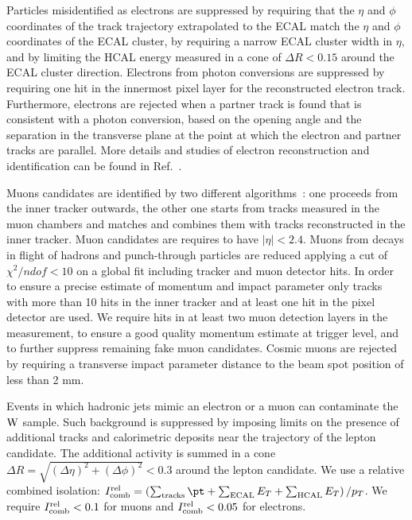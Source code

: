 \par
Particles misidentified as electrons are 
suppressed by requiring that the $\eta$ and $\phi$ coordinates
of the track trajectory extrapolated to the ECAL match the $\eta$ and
$\phi$ coordinates of the ECAL cluster, by requiring a narrow ECAL
cluster width in $\eta$, and by limiting the HCAL energy measured in a
cone of $\Delta R < 0.15$ around the ECAL cluster direction.
Electrons from photon conversions are suppressed by requiring
one hit in the innermost pixel layer for the
reconstructed electron track.  Furthermore, electrons are
rejected when a partner track is found that is consistent with a
photon conversion, based on the opening angle and the separation in
the transverse plane at the point at which the electron and partner
tracks are parallel. More details and studies of electron reconstruction
and identification can be found in Ref.~\cite{CMS-PAS-EGM-10-004}.


\par
Muons candidates are identified by two different 
algorithms~\cite{MUONPAS}: one proceeds from the inner tracker outwards, 
the other one starts from tracks measured in the muon chambers and matches 
and combines them with tracks reconstructed in the inner tracker. 
Muon candidates are requires to have $|\eta| < 2.4$.
Muons from decays in flight of hadrons and punch-through particles are 
reduced applying a cut of $\chi^2/ndof < 10$
on a global fit including tracker and muon detector hits.
In order to ensure a precise estimate of momentum and impact parameter
only tracks with more than 10 hits in the inner tracker and at least 
one hit in the pixel detector are used.
We require hits in at least two muon detection layers in the measurement,
to ensure a good quality momentum estimate at trigger level, and
to further suppress remaining fake muon candidates.
Cosmic muons are rejected by requiring a transverse impact parameter 
distance to the beam spot position of less than 2 mm.


\par
Events in which hadronic jets mimic an electron or a muon can contaminate
the $\mathrm{W}$ sample. Such background is suppressed by imposing limits
on the presence of additional
tracks and calorimetric deposits near the trajectory of the lepton candidate.
The additional activity is summed in a cone
$\Delta R = \sqrt{(\Delta\eta)^2+(\Delta\phi)^2} < 0.3$ around
the lepton candidate. 
We use a relative combined isolation:
$\IRelComb = \left( \sum_{\mathrm{tracks}} \pt + \sum_{\mathrm{ECAL}} \Et+ \sum_{\mathrm{HCAL}} \Et \right)/\Pt$.
We require $I^{\textrm{rel}}_{\textrm{comb}} < 0.1$ for muons and $I^{\textrm{rel}}_{\textrm{comb}} < 0.05$ for 
electrons.
